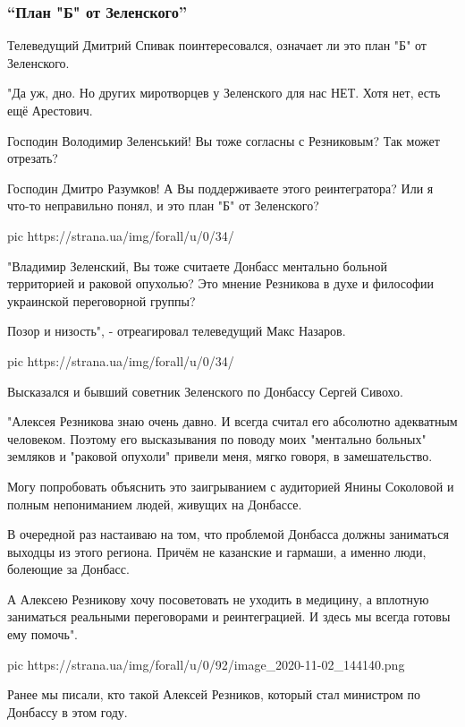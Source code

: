 \subsubsection{\enquote{План "Б" от Зеленского}}

Телеведущий  Дмитрий Спивак поинтересовался, означает ли это план "Б" от
Зеленского.

"Да уж, дно. Но других миротворцев у Зеленского для нас НЕТ. Хотя нет, есть ещё
Арестович.

Господин Володимир Зеленський! Вы тоже согласны с Резниковым? Так может
отрезать?

Господин Дмитро Разумков! А Вы поддерживаете этого реинтегратора? Или я что-то
неправильно понял, и это план "Б" от Зеленского?

\ifcmt
pic https://strana.ua/img/forall/u/0/34/%
\fi

"Владимир Зеленский, Вы тоже считаете Донбасс ментально больной территорией и
раковой опухолью? Это мнение Резникова в духе и философии украинской
переговорной группы?

Позор и низость", - отреагировал телеведущий Макс Назаров.

\ifcmt
pic https://strana.ua/img/forall/u/0/34/%
\fi

Высказался и бывший советник Зеленского по Донбассу Сергей Сивохо.

"Алексея Резникова знаю очень давно. И всегда считал его абсолютно адекватным
человеком. Поэтому его высказывания по поводу моих "ментально больных" земляков
и "раковой опухоли" привели меня, мягко говоря, в замешательство.

Могу попробовать объяснить это заигрыванием с аудиторией Янины Соколовой и
полным непониманием людей, живущих на Донбассе.

В очередной раз настаиваю на том, что проблемой Донбасса должны заниматься
выходцы из этого региона. Причём не казанские и гармаши, а именно люди,
болеющие за Донбасс.

А Алексею Резникову хочу посоветовать не уходить в медицину, а вплотную
заниматься реальными переговорами и реинтеграцией. И здесь мы всегда готовы ему
помочь". 

\ifcmt
pic https://strana.ua/img/forall/u/0/92/image_2020-11-02_144140.png
\fi

Ранее мы писали, кто такой Алексей Резников, который стал министром по Донбассу
в этом году.
